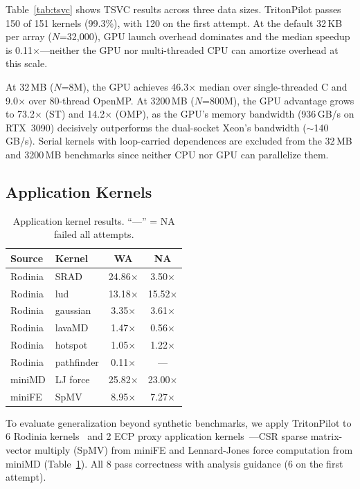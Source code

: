 \documentclass[sigconf]{acmart}
\newcommand{\sysname}{TritonPilot\xspace}
\begin{document}
Table~\ref{tab:tsvc} shows TSVC results across three data sizes.
\sysname passes 150 of 151 kernels (99.3\%), with 120 on the first
attempt.  At the default 32\,KB per array ($N$=32,000), GPU launch
overhead dominates and the median speedup is 0.11$\times$---neither
the GPU nor multi-threaded CPU can amortize overhead at this scale.

At 32\,MB ($N$=8M), the GPU achieves 46.3$\times$ median over
single-threaded C and 9.0$\times$ over 80-thread OpenMP.  At
3200\,MB ($N$=800M), the GPU advantage grows to 73.2$\times$ (ST)
and 14.2$\times$ (OMP), as the GPU's memory bandwidth (936\,GB/s on
RTX~3090) decisively outperforms the dual-socket Xeon's bandwidth
($\sim$140\,GB/s).  Serial kernels with loop-carried dependences are
excluded from the 32\,MB and 3200\,MB benchmarks since neither CPU
nor GPU can parallelize them.


\subsection{Application Kernels}
\label{sec:realworld}

\begin{table}[t]
  \caption{Application kernel results.  ``---'' = NA failed all attempts.}
  \label{tab:realworld}
  \centering\small
  \begin{tabular}{llcc}
    \toprule
    \textbf{Source} & \textbf{Kernel} & \textbf{WA} & \textbf{NA} \\
    \midrule
    Rodinia & SRAD       & 24.86$\times$ & 3.50$\times$ \\
    Rodinia & lud        & 13.18$\times$ & 15.52$\times$ \\
    Rodinia & gaussian   & 3.35$\times$  & 3.61$\times$ \\
    Rodinia & lavaMD     & 1.47$\times$  & 0.56$\times$ \\
    Rodinia & hotspot    & 1.05$\times$  & 1.22$\times$ \\
    Rodinia & pathfinder & 0.11$\times$  & --- \\
    \midrule
    miniMD  & LJ force   & 25.82$\times$ & 23.00$\times$ \\
    miniFE  & SpMV       & 8.95$\times$  & 7.27$\times$ \\
    \bottomrule
  \end{tabular}
\end{table}

To evaluate generalization beyond synthetic benchmarks, we apply
\sysname to 6 Rodinia kernels~\cite{che2009rodinia} and 2 ECP proxy
application kernels~\cite{heroux2009mantevo}---CSR sparse matrix-vector
multiply (SpMV) from miniFE and Lennard-Jones force computation from
miniMD (Table~\ref{tab:realworld}).  All 8 pass correctness with
analysis guidance (6 on the first attempt).
\end{document}
